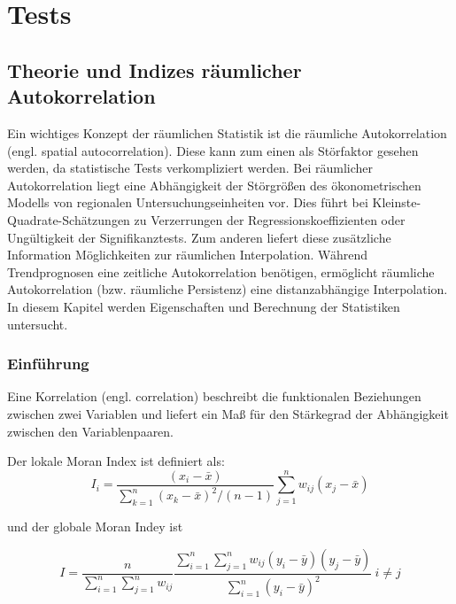 \chapter{Tests}

\section{Theorie und Indizes räumlicher Autokorrelation}

Ein wichtiges Konzept der räumlichen Statistik ist die räumliche Autokorrelation (engl. spatial autocorrelation).
Diese kann zum einen als Störfaktor gesehen werden, da statistische Tests verkompliziert werden. 
Bei räumlicher Autokorrelation liegt eine Abhängigkeit der Störgrößen des ökonometrischen Modells von regionalen 
Untersuchungseinheiten vor. Dies führt bei Kleinste-Quadrate-Schätzungen zu Verzerrungen der Regressionskoeffizienten 
oder Ungültigkeit der Signifikanztests. Zum anderen liefert diese zusätzliche Information Möglichkeiten 
zur räumlichen Interpolation. Während Trendprognosen eine zeitliche Autokorrelation benötigen, 
ermöglicht räumliche Autokorrelation (bzw. räumliche Persistenz) eine distanzabhängige Interpolation. 
In diesem Kapitel werden Eigenschaften und Berechnung der Statistiken untersucht.

\subsection{Einführung}

Eine Korrelation (engl. correlation) beschreibt die funktionalen Beziehungen zwischen zwei 
Variablen und liefert ein Maß für den Stärkegrad der Abhängigkeit zwischen den Variablenpaaren.

Der lokale Moran Index ist definiert als:
\begin{equation}
    I_i = \frac{(x_i-\bar{x})}{{∑_{k=1}^{n}(x_k-\bar{x})^2}/(n-1)}{∑_{j=1}^{n}w_{ij}(x_j-\bar{x})}
\end{equation}

und der globale Moran Indey ist

\begin{equation}
    I=\frac{n}{\sum_{i=1}^{n}\sum_{j=1}^{n}w_{ij}}  \frac{\sum_{i=1}^{n}\sum_{j=1}^{n}{w_{ij}\left(y_i-\bar{y}\right)\left(y_j-\bar{y}\right)}}{\sum_{i=1}^{n}\left(y_i-\bar{y}\right)^2}\ i\neq j
\end{equation}